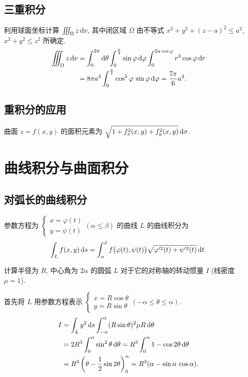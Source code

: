\documentclass[a4paper,10pt,fleqn]{article}
\begin{document}
\subsection{三重积分}

\begin{exmp}
    利用球面坐标计算 $\iiint_\Omega z\,{\rm d}v$, 其中闭区域 $\Omega$ 由不等式 $x^2+y^2+(z-a)^2\leq a^2$,
    $x^2+y^2\leq z^2$ 所确定.
    \begin{align*}
        \iiint_\Omega z\,{\rm d}v & = \int_0^{2\pi}{\rm d}\theta\int_0^{\frac{\pi}{4}}\sin\varphi\,{\rm d}\varphi\int_0^{2a\cos\varphi}r^3\cos\varphi\,{\rm d}r \\
                                  & =8\pi a^4\int_0^{\frac{\pi}{4}}\cos^5\varphi\,\sin\varphi\,{\rm d}\varphi=\frac{7\pi}{6}a^4.
    \end{align*}
\end{exmp}

\subsection{重积分的应用}

曲面 $z=f(x,y)$ 的面积元素为 $\sqrt{1+f_x^2(x,y)+f_y^2(x,y)}\,{\rm d}\sigma$.

\section{曲线积分与曲面积分}

\subsection{对弧长的曲线积分}

\begin{thm}
    参数方程为 $\begin{cases}x=\varphi(t)\\y=\psi(t)\end{cases}(\alpha\leq\beta)$ 的曲线 $L$ 的曲线积分为
    \[
        \int_Lf(x,y)\,{\rm d}s=\int_\alpha^\beta f\big(\varphi(t),\psi(t)\big)\sqrt{\varphi'^2(t)+\psi'^2(t)}\,{\rm d}t.
    \]
\end{thm}

\begin{exmp}
    计算半径为 $R$, 中心角为 $2\alpha$ 的圆弧 $L$ 对于它的对称轴的转动惯量 $I$ (线密度 $\mu=1$).

    首先将 $L$ 用参数方程表示 $\begin{cases}x=R\cos\theta\\y=R\sin\theta\end{cases}(-\alpha\leq\theta\leq\alpha)$.
    \begin{align*}
        I & =\int_Ly^2\,{\rm d}s\int_{-\alpha}^\alpha(R\sin\theta)^2\mu R\,{\rm d}\theta                \\
          & =2R^3\int_0^\alpha\sin^2\theta\,{\rm d}\theta=R^3\int_0^\alpha1-\cos2\theta\,{\rm d}\theta  \\
          & =R^3\left(\theta-\frac{1}{2}\sin2\theta\right)_0^\alpha=R^3(\alpha-\sin\alpha\,\cos\alpha).
    \end{align*}
\end{exmp}
\end{document}
